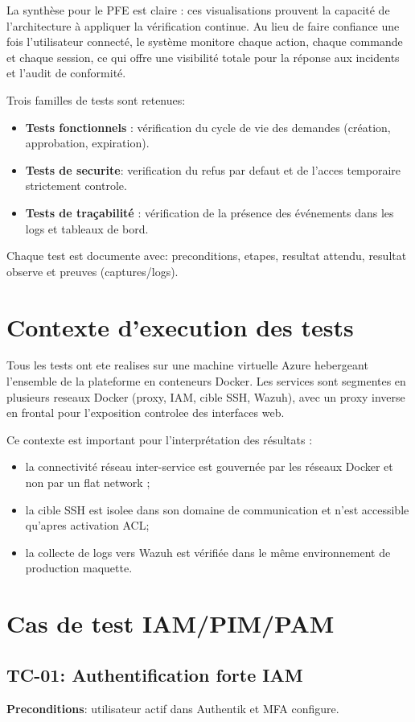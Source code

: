 La synthèse pour le PFE est claire : ces visualisations prouvent la capacité de l'architecture à appliquer la vérification continue. Au lieu de faire confiance une fois l'utilisateur connecté, le système monitore chaque action, chaque commande et chaque session, ce qui offre une visibilité totale pour la réponse aux incidents et l'audit de conformité.

Trois familles de tests sont retenues:
\begin{itemize}
	\item \textbf{Tests fonctionnels} : vérification du cycle de vie des demandes (création, approbation, expiration).
	\item \textbf{Tests de securite}: verification du refus par defaut et de l'acces temporaire strictement controle.
	\item \textbf{Tests de traçabilité} : vérification de la présence des événements dans les logs et tableaux de bord.
\end{itemize}

Chaque test est documente avec: preconditions, etapes, resultat attendu, resultat observe et preuves (captures/logs).

\section{Contexte d'execution des tests}
Tous les tests ont ete realises sur une machine virtuelle Azure hebergeant l'ensemble de la plateforme en conteneurs Docker. Les services sont segmentes en plusieurs reseaux Docker (proxy, IAM, cible SSH, Wazuh), avec un proxy inverse en frontal pour l'exposition controlee des interfaces web.

Ce contexte est important pour l'interprétation des résultats :
\begin{itemize}
	\item la connectivité réseau inter-service est gouvernée par les réseaux Docker et non par un flat network ;
	\item la cible SSH est isolee dans son domaine de communication et n'est accessible qu'apres activation ACL;
	\item la collecte de logs vers Wazuh est vérifiée dans le même environnement de production maquette.
\end{itemize}

\section{Cas de test IAM/PIM/PAM}
\subsection{TC-01: Authentification forte IAM}
\textbf{Preconditions}: utilisateur actif dans Authentik et MFA configure.

